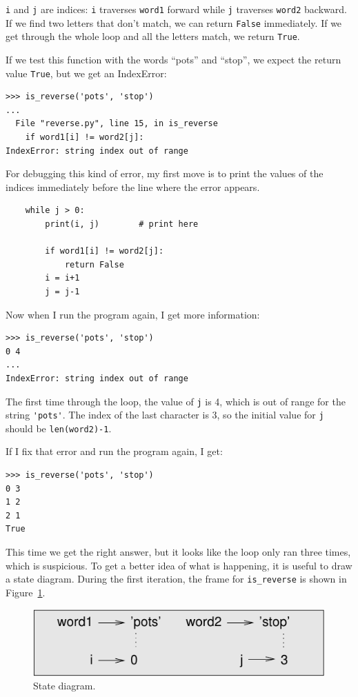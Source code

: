\documentclass[10pt]{book}
\begin{document}
{\tt i} and {\tt j} are indices: {\tt i} traverses {\tt word1}
forward while {\tt j} traverses {\tt word2} backward.  If we find
two letters that don't match, we can return {\tt False} immediately.
If we get through the whole loop and all the letters match, we
return {\tt True}.

If we test this function with the words ``pots'' and ``stop'', we
expect the return value {\tt True}, but we get an IndexError:

\begin{verbatim}
>>> is_reverse('pots', 'stop')
...
  File "reverse.py", line 15, in is_reverse
    if word1[i] != word2[j]:
IndexError: string index out of range
\end{verbatim}
%
For debugging this kind of error, my first move is to
print the values of the indices immediately before the line
where the error appears.

\begin{verbatim}
    while j > 0:
        print(i, j)        # print here
        
        if word1[i] != word2[j]:
            return False
        i = i+1
        j = j-1
\end{verbatim}
%
Now when I run the program again, I get more information:

\begin{verbatim}
>>> is_reverse('pots', 'stop')
0 4
...
IndexError: string index out of range
\end{verbatim}
%
The first time through the loop, the value of {\tt j} is 4,
which is out of range for the string \verb"'pots'".
The index of the last character is 3, so the
initial value for {\tt j} should be {\tt len(word2)-1}.

If I fix that error and run the program again, I get:

\begin{verbatim}
>>> is_reverse('pots', 'stop')
0 3
1 2
2 1
True
\end{verbatim}
%
This time we get the right answer, but it looks like the loop only ran
three times, which is suspicious.  To get a better idea of what is
happening, it is useful to draw a state diagram.  During the first
iteration, the frame for \verb"is_reverse" is shown in
Figure~\ref{fig.state4}.   

\begin{figure}
\centerline
{\includegraphics[scale=0.8]{figs/state4.pdf}}
\caption{State diagram.}
\label{fig.state4}
\end{figure}
\end{document}
